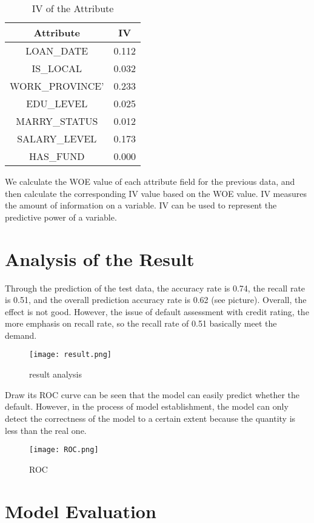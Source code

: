\documentclass{mcmthesis}
\begin{document}
\begin{table}[h]
\centering
\caption{IV of the Attribute}
\begin{tabular}{|c|c|}
\hline
Attribute & IV\\
\hline
LOAN\_DATE & 0.112\\
\hline
IS\_LOCAL & 0.032\\
\hline
WORK\_PROVINCE' & 0.233\\
\hline
EDU\_LEVEL & 0.025\\
\hline
MARRY\_STATUS & 0.012\\
\hline
SALARY\_LEVEL & 0.173\\
\hline
HAS\_FUND & 0.000\\
\hline
\end{tabular}
\label{tab2}
\end{table}

We calculate the WOE value of each attribute field for the previous data, and then calculate the corresponding IV value based on the WOE value. IV measures the amount of information on a variable. IV can be used to represent the predictive power of a variable.

\section{Analysis of the Result}
Through the prediction of the test data, the accuracy rate is 0.74, the recall rate is 0.51, and the overall prediction accuracy rate is 0.62 (see picture). Overall, the effect is not good. However, the issue of default assessment with credit rating, the more emphasis on recall rate, so the recall rate of 0.51 basically meet the demand.
\newpage
\begin{figure}[h]
\small
\centering
\texttt{[image: result.png]}
\caption{result analysis} \label{fig:result analysis}
\end{figure}

Draw its ROC curve can be seen that the model can easily predict whether the default. However, in the process of model establishment, the model can only detect the correctness of the model to a certain extent because the quantity is less than the real one.
\begin{figure}[h]
\small
\centering
\texttt{[image: ROC.png]}
\caption{ROC} \label{fig:ROC}
\end{figure}

\section{Model Evaluation}
\end{document}
